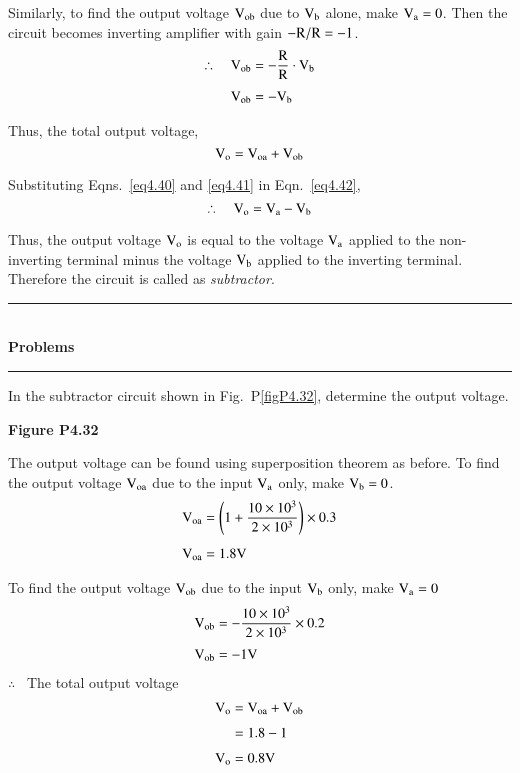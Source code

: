 Similarly, to find the output voltage $\textrm{V}_{\textrm{o}\textrm{b}}$ due to $\textrm{V}_{\textrm{b}}$ alone, make $\textrm{V}_{\textrm{a}}=0$. Then the circuit becomes inverting amplifier with gain $-\textrm{R}/\textrm{R}=-1$.
\begin{align}
\therefore\quad \textrm{V}_{\textrm{o}\textrm{b}} &= -\frac{\textrm{R}}{\textrm{R}}\cdot \textrm{V}_{\textrm{b}}\notag\\[3pt]
\textrm{V}_{\textrm{o}\textrm{b}} &= -\textrm{V}_{\textrm{b}}\label{eq4.41}
\end{align}

Thus, the total output voltage,
\begin{equation}
\textrm{V}_{\textrm{o}}=\textrm{V}_{\textrm{o}\textrm{a}}+\textrm{V}_{\textrm{o}\textrm{b}}\label{eq4.42}
\end{equation}

Substituting Eqns.~\eqref{eq4.40} and \eqref{eq4.41} in Eqn.~\eqref{eq4.42},
\begin{equation}
\therefore\quad \textrm{V}_{\textrm{o}}=\textrm{V}_{\textrm{a}}-\textrm{V}_{\textrm{b}}\label{eq4.43}
\end{equation}

Thus, the output voltage $\textrm{V}_{\textrm{o}}$ is equal to the voltage $\textrm{V}_{\textrm{a}}$ applied to the non-inverting terminal minus the voltage $\textrm{V}_{\textrm{b}}$ applied to the inverting terminal. Therefore the circuit is called as {\em subtractor}.

\begin{center}
\rule{4cm}{1pt}\\
{\bf\Large Problems}\\[-3pt]
\rule{4cm}{1pt}
\end{center}

\begin{problem}\label{prob4.33}
In the subtractor circuit shown in Fig.~P\ref{figP4.32}, determine the output voltage.
\begin{center}
{\bf Figure P4.32}
\end{center}
\end{problem}

\begin{solution}
The output voltage can be found using superposition theorem as before. To find the output voltage $\textrm{V}_{\textrm{o}\textrm{a}}$ due to the input $\textrm{V}_{\textrm{a}}$ only, make $\textrm{V}_{\textrm{b}}=0$.
\begin{align*}
\textrm{V}_{\textrm{o}\textrm{a}} &= \left(1+\frac{10\times 10^{3}}{2\times 10^{3}}\right)\times 0.3\\[4pt]
\textrm{V}_{\textrm{o}\textrm{a}} &= 1.8\textrm{V}
\end{align*}

To find the output voltage $\textrm{V}_{\textrm{o}\textrm{b}}$ due to the input $\textrm{V}_{\textrm{b}}$ only, make $\textrm{V}_{\textrm{a}}=0$
\begin{align*}
\textrm{V}_{\textrm{o}\textrm{b}} &= -\frac{10\times 10^{3}}{2\times 10^{3}}\times 0.2\\[3pt]
\textrm{V}_{\textrm{o}\textrm{b}} &= -1\textrm{V}
\end{align*}
$\therefore$~ The total output voltage 
\begin{align*}
\textrm{V}_{\textrm{o}} &= \textrm{V}_{\textrm{o}\textrm{a}}+\textrm{V}_{\textrm{o}\textrm{b}}\\[3pt]
&= 1.8-1\\[3pt]
\textrm{V}_{\textrm{o}} &= 0.8\textrm{V}
\end{align*}
\end{solution}

